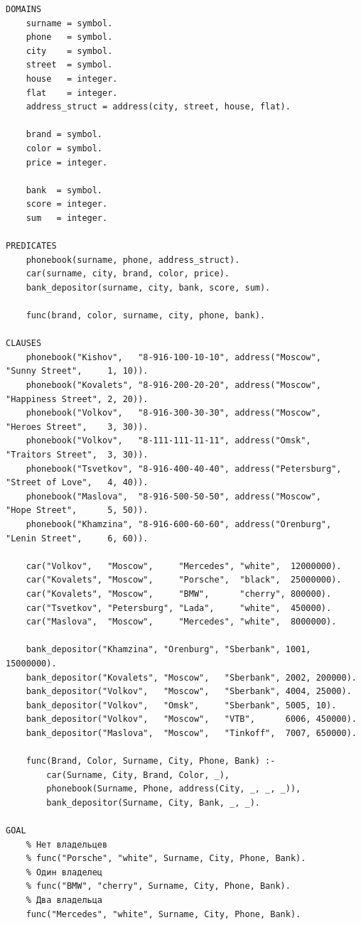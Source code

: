 \documentclass[a4paper,14pt, unknownkeysallowed]{extreport}
\begin{document}
\begin{center}
\captionsetup{justification=raggedright,singlelinecheck=off}
\begin{lstlisting}[label=lst:parallel_processing,caption=Решение задания 2]
DOMAINS 
	surname = symbol.
	phone   = symbol.
	city    = symbol. 
	street  = symbol.
	house   = integer.
	flat    = integer.
	address_struct = address(city, street, house, flat).

	brand = symbol.
	color = symbol.
	price = integer.
	
	bank  = symbol.
	score = integer.
	sum   = integer.

PREDICATES
	phonebook(surname, phone, address_struct).
	car(surname, city, brand, color, price).
	bank_depositor(surname, city, bank, score, sum).
	
	func(brand, color, surname, city, phone, bank).

CLAUSES
	phonebook("Kishov",   "8-916-100-10-10", address("Moscow",     "Sunny Street",     1, 10)).
	phonebook("Kovalets", "8-916-200-20-20", address("Moscow",     "Happiness Street", 2, 20)).
	phonebook("Volkov",   "8-916-300-30-30", address("Moscow",     "Heroes Street",    3, 30)).
	phonebook("Volkov",   "8-111-111-11-11", address("Omsk",       "Traitors Street",  3, 30)).
	phonebook("Tsvetkov", "8-916-400-40-40", address("Petersburg", "Street of Love",   4, 40)).
	phonebook("Maslova",  "8-916-500-50-50", address("Moscow",     "Hope Street",      5, 50)).
	phonebook("Khamzina", "8-916-600-60-60", address("Orenburg",   "Lenin Street",     6, 60)).
	
	car("Volkov",   "Moscow",     "Mercedes", "white",  12000000).
	car("Kovalets", "Moscow",     "Porsche",  "black",  25000000).
	car("Kovalets", "Moscow",     "BMW",      "cherry", 800000).
	car("Tsvetkov", "Petersburg", "Lada",     "white",  450000).
	car("Maslova",  "Moscow",     "Mercedes", "white",  8000000).
	
	bank_depositor("Khamzina", "Orenburg", "Sberbank", 1001, 15000000).
	bank_depositor("Kovalets", "Moscow",   "Sberbank", 2002, 200000).
	bank_depositor("Volkov",   "Moscow",   "Sberbank", 4004, 25000).
	bank_depositor("Volkov",   "Omsk",     "Sberbank", 5005, 10).
	bank_depositor("Volkov",   "Moscow",   "VTB",      6006, 450000).
	bank_depositor("Maslova",  "Moscow",   "Tinkoff",  7007, 650000).
	
	func(Brand, Color, Surname, City, Phone, Bank) :- 
		car(Surname, City, Brand, Color, _), 
		phonebook(Surname, Phone, address(City, _, _, _)),
		bank_depositor(Surname, City, Bank, _, _).

GOAL
	% Нет владельцев
	% func("Porsche", "white", Surname, City, Phone, Bank).
	% Один владелец
	% func("BMW", "cherry", Surname, City, Phone, Bank).
	% Два владельца
	func("Mercedes", "white", Surname, City, Phone, Bank).
\end{lstlisting}
\end{center}
\end{document}
